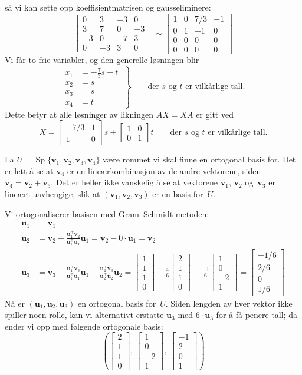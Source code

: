 \documentclass[notitlepage,a4paper,12pt,norsk]{IMFeksamen}
\newcommand{\roweq}{\sim}
\DeclareMathOperator{\Sp}{Sp}
\newcommand{\tr}{^\top}
\newcommand{\V}[1]{\mathbf{#1}}
\newcommand{\vvvv}[4]{\begin{bmatrix} #1 \\ #2 \\ #3 \\ #4 \end{bmatrix}}
\renewcommand{\u}{\V{u}}
\renewcommand{\v}{\V{v}}
\newcommand{\0}{\V{0}}
\newcommand{\oppgslutt}{
\begin{center}
\pgfornament[width=6cm]{88}
\end{center}
}
\newenvironment{losning}{\begin{oppgave}}{\oppgslutt\end{oppgave}}
\begin{document}
\begin{losning}
så vi kan sette opp koeffisientmatrisen og gausseliminere:
\[
\begin{bmatrix}
 0 &  3 & -3 &  0 \\
 3 &  7 &  0 & -3 \\
-3 &  0 & -7 &  3 \\
 0 & -3 &  3 &  0
\end{bmatrix}
\roweq
\begin{bmatrix}
1 & 0 & 7/3 & -1 \\
0 & 1 &  -1 &  0 \\
0 & 0 &   0 &  0 \\
0 & 0 &   0 &  0
\end{bmatrix}
\]
Vi får to frie variabler, og den generelle løsningen blir
\[
\left.
\begin{aligned}
x_1 &= -\frac{7}{3} s + t \\
x_2 &= s \\
x_3 &= s \\
x_4 &= t
\end{aligned}
\;\right\}
\qquad
\text{der $s$ og~$t$ er vilkårlige tall.}
\]
Dette betyr at alle løsninger av likningen $AX = XA$ er gitt ved
\[
X =
\begin{bmatrix}
-7/3 & 1 \\
 1   & 0
\end{bmatrix}
s
+
\begin{bmatrix}
1 & 0 \\
0 & 1
\end{bmatrix}
t
\qquad
\text{der $s$ og~$t$ er vilkårlige tall.}
\]
\end{losning}


\begin{losning}
La
$U = \Sp \{ \v_1, \v_2, \v_3, \v_4 \}$
være rommet vi skal finne en ortogonal basis for.
Det er lett å se at $\v_4$ er en lineærkombinasjon av
de andre vektorene, siden $\v_4 = \v_2 + \v_3$.
Det er heller ikke vanskelig å se at vektorene
$\v_1$, $\v_2$ og~$\v_3$
er lineært uavhengige,
slik at $(\v_1, \v_2, \v_3)$ er en basis for~$U$.

Vi ortogonaliserer basisen med Gram--Schmidt-metoden:
\begin{align*}
\u_1 &= \v_1 \\
\u_2 &= \v_2 - \frac{\u_1\tr \v_2}{\u_1\tr \u_1} \u_1 = \v_2 - 0 \cdot \u_1 = \v_2 \\
\u_3 &= \v_3 - \frac{\u_1\tr \v_3}{\u_1\tr \u_1} \u_1 - \frac{\u_2\tr \v_3}{\u_2\tr \u_2} \u_2
      = \vvvv{1}{1}{1}{0} - \frac{4}{6} \vvvv{2}{1}{1}{0} - \frac{-1}{6} \vvvv{1}{0}{-2}{1}
      = \vvvv{-1/6}{2/6}{0}{1/6}
\end{align*}
Nå er $(\u_1, \u_2, \u_3)$ en ortogonal basis for~$U$.
Siden lengden av hver vektor ikke spiller noen rolle,
kan vi alternativt erstatte $\u_3$ med $6 \cdot \u_3$ for å få penere tall;
da ender vi opp med følgende ortogonale basis:
\[
\left(
\vvvv{2}{1}{1}{0},\ %
\vvvv{1}{0}{-2}{1},\ %
\vvvv{-1}{2}{0}{1}
\right)
\]
\end{losning}
\end{document}
